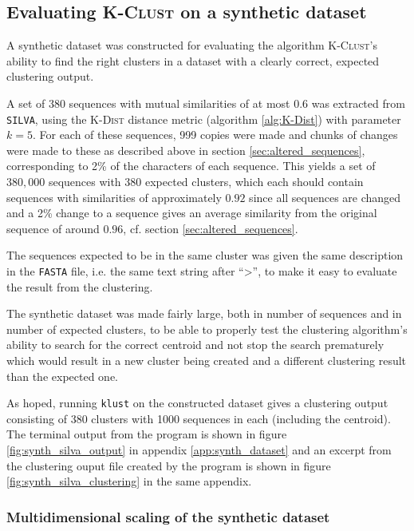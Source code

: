 \subsection{Evaluating \textsc{K-Clust} on a synthetic dataset}
\label{sec:synth_dataset}

A synthetic dataset was constructed for evaluating the algorithm
\textsc{K-Clust}'s ability to find the right clusters in a dataset with a
clearly correct, expected clustering output.

A set of 380 sequences with mutual similarities of at most 0.6 was extracted
from \texttt{SILVA}, using the \textsc{K-Dist} distance metric (algorithm
\ref{alg:K-Dist}) with parameter $k=5$. For each of these sequences, 999 copies
were made and chunks of changes were made to these as described above in
section \ref{sec:altered_sequences}, corresponding to 2\% of the characters of
each sequence. This yields a set of $380,000$ sequences with 380 expected
clusters, which each should contain sequences with similarities of
approximately $0.92$ since all sequences are changed and a 2\% change to a
sequence gives an average similarity from the original sequence of around
$0.96$, cf. section \ref{sec:altered_sequences}.

The sequences expected to be in the same cluster was given the same description
in the \texttt{FASTA} file, i.e. the same text string after ``>'', to make it
easy to evaluate the result from the clustering.

The synthetic dataset was made fairly large, both in number of sequences and in
number of expected clusters, to be able to properly test the clustering
algorithm's ability to search for the correct centroid and not stop the search
prematurely which would result in a new cluster being created and a different
clustering result than the expected one.

As hoped, running \texttt{klust} on the constructed dataset gives a clustering
output consisting of 380 clusters with 1000 sequences in each (including the
centroid). The terminal output from the program is shown in figure
\ref{fig:synth_silva_output} in appendix \ref{app:synth_dataset} and an excerpt
from the clustering ouput file created by the program is shown in figure
\ref{fig:synth_silva_clustering} in the same appendix.


\subsubsection{Multidimensional scaling of the synthetic dataset}

